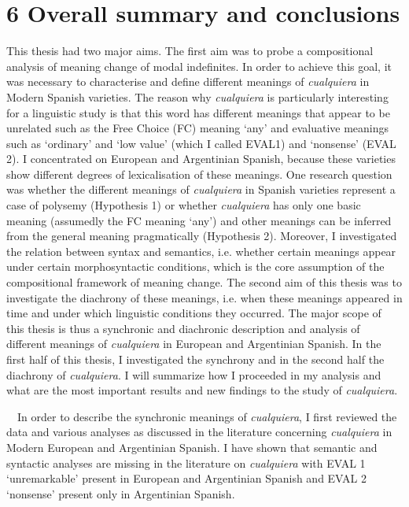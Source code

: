 \clearpage\section[6 Overall summary and conclusions]{6 Overall summary and conclusions}
\begin{styleStandard}
This thesis had two major aims. The first aim was to probe a compositional analysis of meaning change of modal indefinites. In order to achieve this goal, it was necessary to characterise and define different meanings of \textit{cualquiera} in Modern Spanish varieties. The reason why \textit{cualquiera} is particularly interesting for a linguistic study is that this word has different meanings that appear to be unrelated such as the Free Choice (FC) meaning ‘any’ and evaluative meanings such as ‘ordinary’ and ‘low value’ (which I called EVAL1) and ‘nonsense’ (EVAL 2). I concentrated on European and Argentinian Spanish, because these varieties show different degrees of lexicalisation of these meanings. One research question was whether the different meanings of \textit{cualquiera} in Spanish varieties represent a case of polysemy (Hypothesis 1) or whether \textit{cualquiera} has only one basic meaning (assumedly the FC meaning ‘any’) and other meanings can be inferred from the general meaning pragmatically (Hypothesis 2). Moreover, I investigated the relation between syntax and semantics, i.e. whether certain meanings appear under certain morphosyntactic conditions, which is the core assumption of the compositional framework of meaning change. The second aim of this thesis was to investigate the diachrony of these meanings, i.e. when these meanings appeared in time and under which linguistic conditions they occurred. The major scope of this thesis is thus a synchronic and diachronic description and analysis of different meanings of \textit{cualquiera} in European and Argentinian Spanish. In the first half of this thesis, I investigated the synchrony and in the second half the diachrony of \textit{cualquiera}. I will summarize how I proceeded in my analysis and what are the most important results and new findings to the study of \textit{cualquiera}.
\end{styleStandard}

\begin{styleStandard}
\ \ In order to describe the synchronic meanings of \textit{cualquiera}, I first reviewed the data and various analyses as discussed in the literature concerning \textit{cualquiera} in Modern European and Argentinian Spanish. I have shown that semantic and syntactic analyses are missing in the literature on \textit{cualquiera} with EVAL 1 ‘unremarkable’ present in European and Argentinian Spanish and EVAL 2 ‘nonsense’ present only in Argentinian Spanish.
\end{styleStandard}


